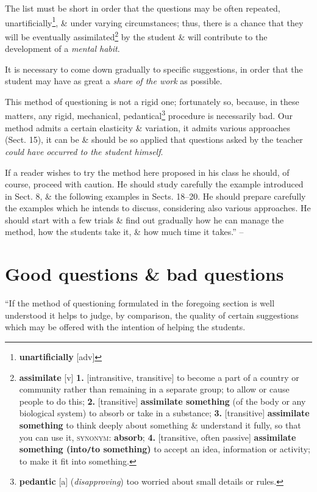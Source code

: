\documentclass[oneside]{book}
\numberwithin{equation}{section}
\begin{document}
The list must be short in order that the questions may be often repeated, unartificially\footnote{\textbf{unartificially} [adv]}, \& under varying circumstances; thus, there is a chance that they will be eventually assimilated\footnote{\textbf{assimilate} [v] \textbf{1.} [intransitive, transitive] to become a part of a country or community rather than remaining in a separate group; to allow or cause people to do this; \textbf{2.} [transitive] \textbf{assimilate something} (of the body or any biological system) to absorb or take in a substance; \textbf{3.} [transitive] \textbf{assimilate something} to think deeply about something \& understand it fully, so that you can use it, \textsc{synonym}: \textbf{absorb}; \textbf{4.} [transitive, often passive] \textbf{assimilate something (into\texttt{/}to something)} to accept an idea, information or activity; to make it fit into something.} by the student \& will contribute to the development of a \textit{mental habit}.

It is necessary to come down gradually to specific suggestions, in order that the student may have as great a \textit{share of the work} as possible.

This method of questioning is not a rigid one; fortunately so, because, in these matters, any rigid, mechanical, pedantical\footnote{\textbf{pedantic} [a] (\textit{disapproving}) too worried about small details or rules.} procedure is necessarily bad. Our method admits a certain elasticity \& variation, it admits various approaches (Sect. 15), it can be \& should be so applied that questions asked by the teacher \textit{could have occurred to the student himself}.

If a reader wishes to try the method here proposed in his class he should, of course, proceed with caution. He should study carefully the example introduced in Sect. 8, \& the following examples in Sects. 18--20. He should prepare carefully the examples which he intends to discuss, considering also various approaches. He should start with a few trials \& find out gradually how he can manage the method, how the students take it, \& how much time it takes.'' -- \cite[pp. 20--22]{Polya2014}

\section{Good questions \& bad questions}
``If the method of questioning formulated in the foregoing section is well understood it helps to judge, by comparison, the quality of certain suggestions which may be offered with the intention of helping the students.
\end{document}
